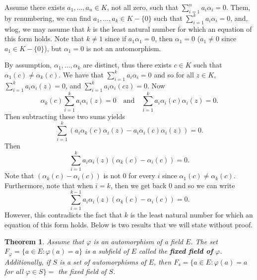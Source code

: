 \documentclass{article}
\makeatletter
\newtheorem{theorem}{Theorem}
\theoremstyle{definition}
\theoremstyle{remark}
\let\oldproofname=\proofname
\renewcommand{\proofname}{\bf{\textit{\oldproofname}}}
\theoremstyle{definition}
\renewenvironment{proof}[1][\proofname]{\par
  \pushQED{\qed}%
  \normalfont \topsep6\p@\@plus6\p@\relax
  \list{}{\leftmargin=0mm
          \rightmargin=0mm
          \settowidth{\itemindent}{\itshape#1}%
          \labelwidth=\itemindent
          \parsep=0pt \listparindent=0mm%
  }
  \item[\hskip\labelsep
        \itshape
    #1\@addpunct{.}]\ignorespaces
}{%
  \popQED\endlist\@endpefalse
}
\makeatother
\begin{document}
        \begin{proof}
            Assume there exists $a_1,\dots,a_n\in K$, not all zero, such that $\sum_{i=1}^na_i\alpha_i=0$. Them, by renumbering, we can find $a_1,\dots,a_k\in K-\{0\}$ such that $\sum_{i=1}^ka_i\alpha_i=0$, and, wlog, we may assume that $k$ is the least natural number for which an equation of this form holds. Note that $k\neq 1$ since if $a_1\alpha_1=0$, then $\alpha_1=0$ ($a_1\neq 0$ since $a_1\in K-\{0\}$), but $\alpha_1=0$ is not an automorphism.\par\hspace{4mm} By assumption, $\alpha_1,\dots,\alpha_k$ are distinct, thus there exists $c\in K$ such that $\alpha_1(c)\neq \alpha_k(c)$. We have that $\sum_{i=1}^ka_i\alpha_i=0$ and so for all $z\in K$, $\sum_{i=1}^ka_i\alpha_i(z)=0$, and $\sum_{i=1}^ka_i\alpha_i(cz)=0$. Now 
                \begin{equation*}
                    \alpha_k(c)\sum_{i=1}^ka_i\alpha_i(z)=0\quad\text{and}\quad\sum_{i=1}^ka_i\alpha_i(c)\alpha_i(z)=0.
                \end{equation*}
            Then subtracting these two sums yields
                \begin{equation*}
                    \sum_{i=1}^k(a_i\alpha_k(c)\alpha_i(z)-a_i\alpha_i(c)\alpha_i(z))=0.
                \end{equation*}
            Then
                \begin{equation*}
                    \sum_{i=1}^ka_i\alpha_i(z)(\alpha_k(c)-\alpha_i(c))=0.
                \end{equation*}
            Note that $(\alpha_k(c)-\alpha_i(c))$ is not 0 for every $i$ since $\alpha_1(c)\neq\alpha_k(c)$. Furthermore, note that when $i=k$, then we get back 0 and so we can write
                \begin{equation*}
                    \sum_{i=1}^{k-1}a_i\alpha_i(z)(\alpha_k(c)-\alpha_i(c))=0.
                \end{equation*}
            However, this contradicts the fact that $k$ is the least natural number for which an equation of this form holds.
        \end{proof}
    Below is two results that we will state without proof.
        \begin{theorem}
            Assume that $\varphi$ is an automorphism of a field $E$. The set $F_{\varphi}=\{a\in E\colon\varphi(a)=a\}$ is a subfield of $E$ called the \textbf{\textit{fixed field of}} $\varphi$. Additionally, if $S$ is a set of automorphisms of $E$, then $F_s=\{a\in E\colon\varphi(a)=a$ for all $\varphi\in S\}=$ the fixed field of $S$.
        \end{theorem}
\end{document}
